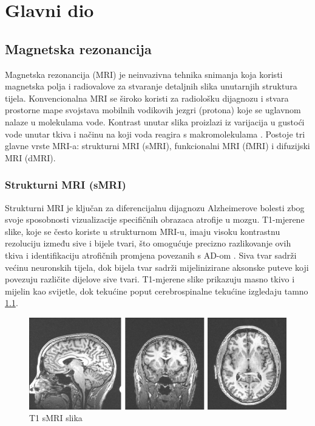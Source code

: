 \documentclass[zavrsnirad]{fer}
\begin{document}
\chapter{Glavni dio}
\label{pog:glavni_dio}

\section{Magnetska rezonancija}

Magnetska rezonancija (MRI) je neinvazivna tehnika snimanja koja koristi magnetska polja i radiovalove za stvaranje detaljnih slika unutarnjih struktura tijela. Konvencionalna MRI se široko koristi za radiološku dijagnozu i stvara prostorne mape svojstava mobilnih vodikovih jezgri (protona) koje se uglavnom nalaze u molekulama vode. Kontrast unutar slika proizlazi iz varijacija u gustoći vode unutar tkiva i načinu na koji voda reagira s makromolekulama \cite{Gore2003}. Postoje tri glavne vrste MRI-a: strukturni MRI (sMRI), funkcionalni MRI (fMRI) i difuzijski MRI (dMRI).


\subsection{Strukturni MRI (sMRI)}
Strukturni MRI je ključan za diferencijalnu dijagnozu Alzheimerove bolesti zbog svoje sposobnosti vizualizacije specifičnih obrazaca atrofije u mozgu. T1-mjerene slike, koje se često koriste u strukturnom MRI-u, imaju visoku kontrastnu rezoluciju između sive i bijele tvari, što omogućuje precizno razlikovanje ovih tkiva i identifikaciju atrofičnih promjena povezanih s AD-om \cite{Gonuguntla2022}. Siva tvar sadrži većinu neuronskih tijela, dok bijela tvar sadrži mijelinizirane aksonske puteve koji povezuju različite dijelove sive tvari. T1-mjerene slike prikazuju masno tkivo i mijelin kao svijetle, dok tekućine poput cerebrospinalne tekućine izgledaju tamno \ref{fig:sMRI_T1}.

\begin{figure}[h]
	\centering
	\includegraphics[width=1\textwidth]{Figures/T1_sMRI.png}
	\caption{T1 sMRI slika \cite{ucsd2021}}
	\label{fig:sMRI_T1}
\end{figure}
\end{document}
